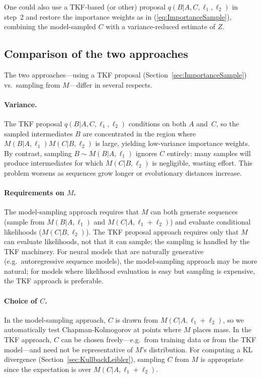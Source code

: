\documentclass{article}
\newcommand\eqnref[1]{(\ref{eq:#1})}
\newcommand\secref[1]{Section~\ref{sec:#1}}
\begin{document}
One could also use a TKF-based (or other) proposal $q(B|A,C,\ell_1,\ell_2)$ in step~2
and restore the importance weights as in \eqnref{ImportanceSample},
combining the model-sampled $C$ with a variance-reduced estimate of $Z$.

\subsection{Comparison of the two approaches}

The two approaches---using a TKF proposal (\secref{ImportanceSample}) vs.\ sampling from $M$---differ
in several respects.

\paragraph{Variance.}
The TKF proposal $q(B|A,C,\ell_1,\ell_2)$ conditions on both $A$ and~$C$,
so the sampled intermediates $B$ are concentrated in the region where
$M(B|A,\ell_1)M(C|B,\ell_2)$ is large,
yielding low-variance importance weights.
By contrast, sampling $B \sim M(B|A,\ell_1)$ ignores $C$ entirely:
many samples will produce intermediates for which $M(C|B,\ell_2)$ is negligible,
wasting effort. This problem worsens as sequences grow longer or evolutionary distances increase.

\paragraph{Requirements on $M$.}
The model-sampling approach requires that $M$ can both generate sequences
(sample from $M(B|A,\ell_1)$ and $M(C|A,\ell_1+\ell_2)$) and
evaluate conditional likelihoods ($M(C|B,\ell_2)$).
The TKF proposal approach requires only that $M$ can evaluate likelihoods,
not that it can sample; the sampling is handled by the TKF machinery.
For neural models that are naturally generative (e.g.\ autoregressive sequence models),
the model-sampling approach may be more natural;
for models where likelihood evaluation is easy but sampling is expensive, the TKF approach is preferable.

\paragraph{Choice of $C$.}
In the model-sampling approach, $C$ is drawn from $M(C|A,\ell_1+\ell_2)$,
so we automatically test Chapman-Kolmogorov at points where $M$ places mass.
In the TKF approach, $C$ can be chosen freely---e.g.\ from training data
or from the TKF model---and need not be representative of $M$'s distribution.
For computing a KL divergence (\secref{KullbackLeibler}), sampling $C$ from $M$ is appropriate
since the expectation is over $M(C|A,\ell_1+\ell_2)$.
\end{document}

